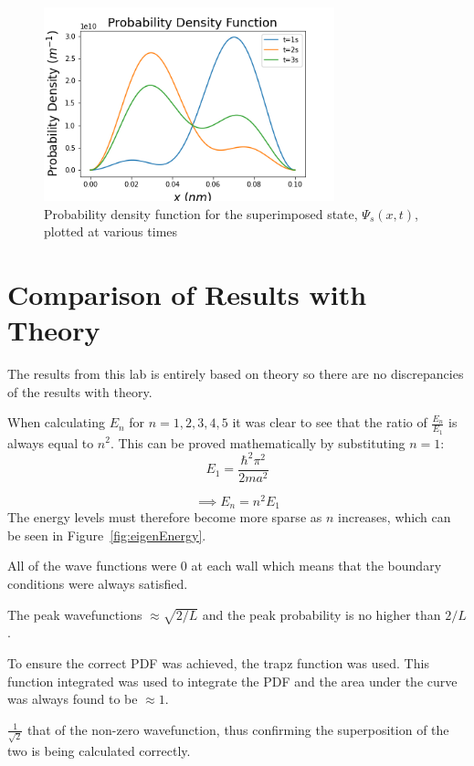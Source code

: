 \begin{figure}[h]
    \centering
    \includegraphics[width=0.75\textwidth]{lab1/images/superpositionPDF.png}
    \caption{Probability density function for the superimposed state, $\Psi_s (x,t)$, plotted at various times}
    \label{fig:superPosPDF}
\end{figure}

\section{Comparison of Results with Theory}

The results from this lab is entirely based on theory so there are no discrepancies of the results with theory.

When calculating $E_n$ for $n=1,2,3,4,5$ it was clear to see that the ratio of $\frac{E_n}{E_1}$ is always equal to $n^{2}$. This can be proved mathematically by substituting $n=1$:
$$E_1 = \frac{\hbar ^{2}\pi^{2}}{2ma^{2}}$$

\begin{equation}%
\implies E_n =  n^{2}E_1
\end{equation}
The energy levels must therefore become more sparse as $n$ increases, which can be seen in Figure~\ref{fig:eigenEnergy}.

All of the wave functions were 0 at each wall which means that the boundary conditions were always satisfied.

The peak wavefunctions $\approx \sqrt{2/L}$ and the peak probability is no higher than $2/L$.

To ensure the correct PDF was achieved, the trapz function was used. This function integrated was used to integrate the PDF and the area under the curve was always found to be $\approx 1$.


$\frac{1}{\sqrt{2}}$ that of the non-zero wavefunction, thus confirming the superposition of the two is being calculated correctly. 

